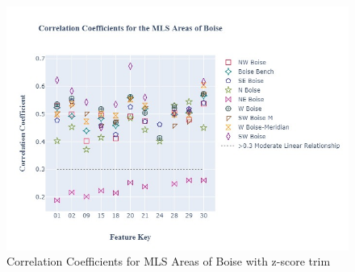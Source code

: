 \documentclass{article}
\begin{document}
\begin{figure}[H]
    \centering
    \includegraphics[width= .7\linewidth]{images/Ex_Area_fig.jpg}
    \caption{Correlation Coefficients for MLS Areas of Boise with z-score trim}
    \label{fig: area_ccl}
\end{figure}
\end{document}
